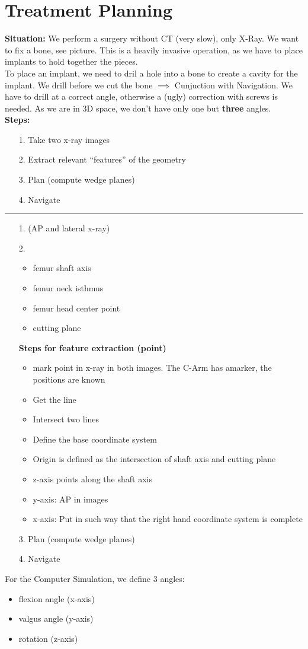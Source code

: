\documentclass{exerciseBlue}
\newcommand{\cmark}{\ding{51}}%
\begin{document}
\section{Treatment Planning}
\textbf{Situation:} We perform a surgery without CT (very slow), only X-Ray. We want to fix a bone, see picture. This is a heavily invasive operation, as we have to place implants to hold together the pieces. \\
To place an implant, we need to dril a hole into a bone to create a cavity for the implant. We drill before we cut the bone $\implies$ Cunjuction with Navigation. We have to drill at a correct angle, otherwise a (ugly) correction with screws is needed. As we are in 3D space, we don't have only one but \textbf{three} angles.\\
\textbf{Steps:}
\begin{enumerate}
	\item[1.] Take two x-ray images
	\item[2.] Extract relevant ``features'' of the geometry
	\item[3.] Plan (compute wedge planes)
	\item[4.] Navigate
\end{enumerate}
\noindent\rule{\textwidth}{0.3pt}
\begin{enumerate}
	\item[1.] \cmark (AP and lateral x-ray)
	\item[2.] \begin{itemize}
		\item femur shaft axis
		\item femur neck isthmus
		\item femur head center point
		\item cutting plane
	\end{itemize}
	\textbf{Steps for feature extraction (point)}
	\begin{itemize}
		\item mark point in x-ray in both images. The C-Arm has amarker, the positions are known
		\item Get the line
		\item Intersect two lines
		\item Define the base coordinate system
		\item Origin is defined as the intersection of shaft axis and cutting plane
		\item z-axis points along the shaft axis
		\item y-axis: AP in images
		\item x-axis: Put in such way that the right hand coordinate system is complete
	\end{itemize}
	\item[3.] Plan (compute wedge planes)
	\item[4.] Navigate
\end{enumerate}
For the Computer Simulation, we define 3 angles:
\begin{itemize}
	\item flexion angle (x-axis)
	\item valgus angle (y-axis)
	\item rotation (z-axis)
\end{itemize}
\end{document}
